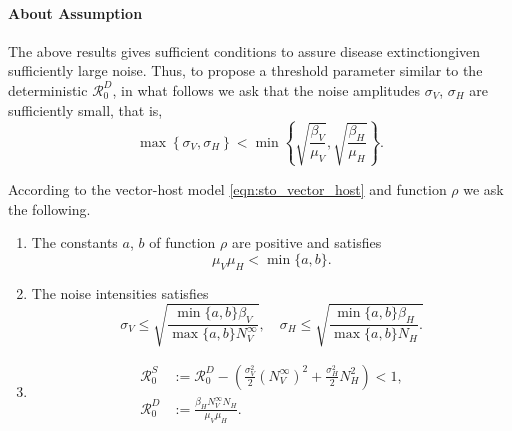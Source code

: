 \paragraph{About Assumption}
The above results gives sufficient conditions to assure 
disease extinction\textemdash given sufficiently large noise. Thus, 
to propose a threshold parameter similar  to the deterministic
$\mathcal{R}_0^D$, in what follows we ask that the noise amplitudes 
$\sigma_V$, $\sigma_H$ are sufficiently small, that is,
\begin{equation}\label{eqn:noise_small_condition}
    \displaystyle
    \max
        \left \{
              \sigma_V, \sigma_H 
        \right\} 
        < 
    \min 
        \left \{
            \sqrt{\frac{\beta_V}{\mu_V}},
            \sqrt{\frac{\beta_H}{\mu_H}}
        \right \}.
\end{equation}
%
%
%
\begin{assumption}\label{ass:extinction}
    According to the vector-host model \eqref{eqn:sto_vector_host} and 
    function
    $\rho$
    we ask the following.
    \begin{enumerate}[\bf{(E\textendash}1)]
        \item 
            The constants $a$, $b$ of function $\rho$ are positive and satisfies
            $$
                \mu_V \mu_H < \min \{a, b \}.
            $$
        \item \label{ass:noise_condition}
            The noise intensities satisfies
            $$
                \sigma_V \leq 
                    \sqrt{
                        \frac{
                            \min\{a, b\}
                            \beta_V
                        }{
                            \max \{a, b \}
                            N_V^{\infty}
                        }
                    },
                 \quad
                \sigma_H \leq
                    \sqrt{
                        \frac{
                            \min\{a, b\}
                            \beta_H
                        }{
                            \max \{a, b \}
                            N_H
                        }.
                    }
            $$
        \item
            \begin{equation*}
                \begin{aligned}
                    \mathcal{R}_0 ^ S &:=
                        \mathcal{R}_0^D - 
                        \left( 
                            \frac{\sigma_V ^ 2}{2} (N_V ^ {\infty}) ^ 2
                            +
                            \frac{\sigma_H ^ 2}{2} N_H ^ 2
                        \right)
                        <1,
                        \\
                    \mathcal{R}_0 ^ D &:=
                            \frac{
                                 \beta_H N_V ^ \infty N_H}{\mu_V \mu_H} .
                \end{aligned}
            \end{equation*}
    \end{enumerate}
\end{assumption}        
